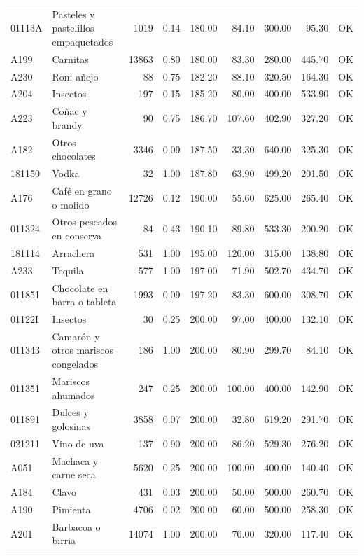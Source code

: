 \begin{table}[ht]
\begin{tabular}{llrrrrrrl}
  01113A & Pasteles y pastelillos empaquetados & 1019 & 0.14 & 180.00 & 84.10 & 300.00 & 95.30 & OK \\ 
  A199 & Carnitas & 13863 & 0.80 & 180.00 & 83.30 & 280.00 & 445.70 & OK \\ 
  A230 & Ron: añejo &  88 & 0.75 & 182.20 & 88.10 & 320.50 & 164.30 & OK \\ 
  A204 & Insectos & 197 & 0.15 & 185.20 & 80.00 & 400.00 & 533.90 & OK \\ 
  A223 & Coñac y brandy &  90 & 0.75 & 186.70 & 107.60 & 402.90 & 327.20 & OK \\ 
  A182 & Otros chocolates & 3346 & 0.09 & 187.50 & 33.30 & 640.00 & 325.30 & OK \\ 
  181150 & Vodka &  32 & 1.00 & 187.80 & 63.90 & 499.20 & 201.50 & OK \\ 
  A176 & Café en grano o molido & 12726 & 0.12 & 190.00 & 55.60 & 625.00 & 265.40 & OK \\ 
  011324 & Otros pescados en conserva &  84 & 0.43 & 190.10 & 89.80 & 533.30 & 200.20 & OK \\ 
  181114 & Arrachera & 531 & 1.00 & 195.00 & 120.00 & 315.00 & 138.80 & OK \\ 
  A233 & Tequila & 577 & 1.00 & 197.00 & 71.90 & 502.70 & 434.70 & OK \\ 
  011851 & Chocolate en barra o tableta & 1993 & 0.09 & 197.20 & 83.30 & 600.00 & 308.70 & OK \\ 
  01122I & Insectos &  30 & 0.25 & 200.00 & 97.00 & 400.00 & 132.10 & OK \\ 
  011343 & Camarón y otros mariscos congelados & 186 & 1.00 & 200.00 & 80.90 & 299.70 & 84.10 & OK \\ 
  011351 & Mariscos ahumados & 247 & 0.25 & 200.00 & 100.00 & 400.00 & 142.90 & OK \\ 
  011891 & Dulces y golosinas & 3858 & 0.07 & 200.00 & 32.80 & 619.20 & 291.70 & OK \\ 
  021211 & Vino de uva & 137 & 0.90 & 200.00 & 86.20 & 529.30 & 276.20 & OK \\ 
  A051 & Machaca y carne seca & 5620 & 0.25 & 200.00 & 100.00 & 400.00 & 140.40 & OK \\ 
  A184 & Clavo & 431 & 0.03 & 200.00 & 50.00 & 500.00 & 260.70 & OK \\ 
  A190 & Pimienta & 4706 & 0.02 & 200.00 & 60.00 & 500.00 & 258.30 & OK \\ 
  A201 & Barbacoa o birria & 14074 & 1.00 & 200.00 & 70.00 & 320.00 & 117.40 & OK \\ 

\end{tabular}
\end{table}
